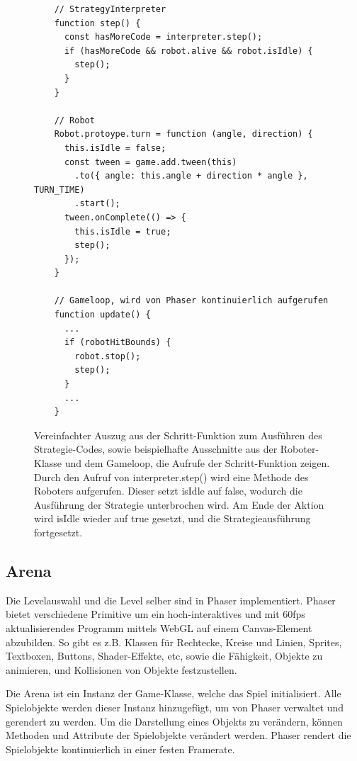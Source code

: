 \begin{figure}
  \caption{Vereinfachter Auszug aus der Schritt-Funktion zum Ausführen des Strategie-Codes, sowie
  beispielhafte Ausschnitte aus der Roboter-Klasse und dem Gameloop, die Aufrufe der
  Schritt-Funktion zeigen. Durch den Aufruf von interpreter.step() wird eine Methode des Roboters
  aufgerufen. Dieser setzt isIdle auf false, wodurch die Ausführung der Strategie unterbrochen wird.
  Am Ende der Aktion wird isIdle wieder auf true gesetzt, und die Strategieausführung fortgesetzt.}

  \label{interpreter-step}

  \begin{lstlisting}
    // StrategyInterpreter
    function step() {
      const hasMoreCode = interpreter.step();
      if (hasMoreCode && robot.alive && robot.isIdle) {
        step();
      }
    }

    // Robot
    Robot.protoype.turn = function (angle, direction) {
      this.isIdle = false;
      const tween = game.add.tween(this)
        .to({ angle: this.angle + direction * angle }, TURN_TIME)
        .start();
      tween.onComplete(() => {
        this.isIdle = true;
        step();
      });
    }

    // Gameloop, wird von Phaser kontinuierlich aufgerufen
    function update() {
      ...
      if (robotHitBounds) {
        robot.stop();
        step();
      }
      ...
    }
  \end{lstlisting}
\end{figure}


\subsection{Arena}

\label{arena-alt}

Die Levelauswahl und die Level selber sind in Phaser implementiert. Phaser bietet verschiedene
Primitive um ein hoch-interaktives und mit 60fps aktualisierendes Programm mittels WebGL auf einem
Canvas-Element abzubilden. So gibt es z.B. Klassen für Rechtecke, Kreise und Linien, Sprites,
Textboxen, Buttons, Shader-Effekte, etc, sowie die Fähigkeit, Objekte zu animieren, und Kollisionen
von Objekte festzustellen.

Die Arena ist ein Instanz der Game-Klasse, welche das Spiel initialisiert. Alle Spielobjekte werden
dieser Instanz hinzugefügt, um von Phaser verwaltet und gerendert zu werden. Um die Darstellung
eines Objekts zu verändern, können Methoden und Attribute der Spielobjekte verändert werden. Phaser
rendert die Spielobjekte kontinuierlich in einer festen Framerate.

